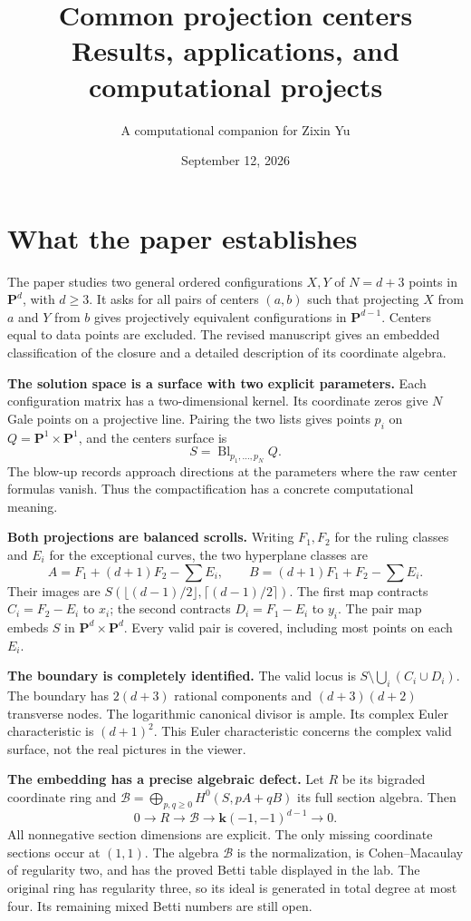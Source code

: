 \documentclass[11pt]{article}
\title{Common projection centers\\\large Results, applications, and computational projects}
\author{A computational companion for Zixin Yu}
\date{September 12, 2026}
\newcommand{\PP}{\mathbf P}
\newcommand{\Bl}{\operatorname{Bl}}
\newcommand{\kk}{\mathbf k}
\begin{document}
\maketitle

\section{What the paper establishes}
The paper studies two general ordered configurations $X,Y$ of $N=d+3$ points in $\PP^d$, with $d\geq3$. It asks for all pairs of centers $(a,b)$ such that projecting $X$ from $a$ and $Y$ from $b$ gives projectively equivalent configurations in $\PP^{d-1}$. Centers equal to data points are excluded. The revised manuscript gives an embedded classification of the closure and a detailed description of its coordinate algebra.

\textbf{The solution space is a surface with two explicit parameters.} Each configuration matrix has a two-dimensional kernel. Its coordinate zeros give $N$ Gale points on a projective line. Pairing the two lists gives points $p_i$ on $Q=\PP^1\times\PP^1$, and the centers surface is
\[
S=\Bl_{p_1,\ldots,p_N}Q.
\]
The blow-up records approach directions at the parameters where the raw center formulas vanish. Thus the compactification has a concrete computational meaning.

\textbf{Both projections are balanced scrolls.} Writing $F_1,F_2$ for the ruling classes and $E_i$ for the exceptional curves, the two hyperplane classes are
\[
A=F_1+(d+1)F_2-\sum E_i,\qquad
B=(d+1)F_1+F_2-\sum E_i.
\]
Their images are $S(\lfloor(d-1)/2\rfloor,\lceil(d-1)/2\rceil)$. The first map contracts $C_i=F_2-E_i$ to $x_i$; the second contracts $D_i=F_1-E_i$ to $y_i$. The pair map embeds $S$ in $\PP^d\times\PP^d$. Every valid pair is covered, including most points on each $E_i$.

\textbf{The boundary is completely identified.} The valid locus is $S\setminus\bigcup_i(C_i\cup D_i)$. The boundary has $2(d+3)$ rational components and $(d+3)(d+2)$ transverse nodes. The logarithmic canonical divisor is ample. Its complex Euler characteristic is $(d+1)^2$. This Euler characteristic concerns the complex valid surface, not the real pictures in the viewer.

\textbf{The embedding has a precise algebraic defect.} Let $R$ be its bigraded coordinate ring and $\mathscr B=\bigoplus_{p,q\geq0}H^0(S,pA+qB)$ its full section algebra. Then
\[
0\longrightarrow R\longrightarrow\mathscr B\longrightarrow
\kk(-1,-1)^{d-1}\longrightarrow0.
\]
All nonnegative section dimensions are explicit. The only missing coordinate sections occur at $(1,1)$. The algebra $\mathscr B$ is the normalization, is Cohen--Macaulay of regularity two, and has the proved Betti table displayed in the lab. The original ring has regularity three, so its ideal is generated in total degree at most four. Its remaining mixed Betti numbers are still open.
\end{document}
